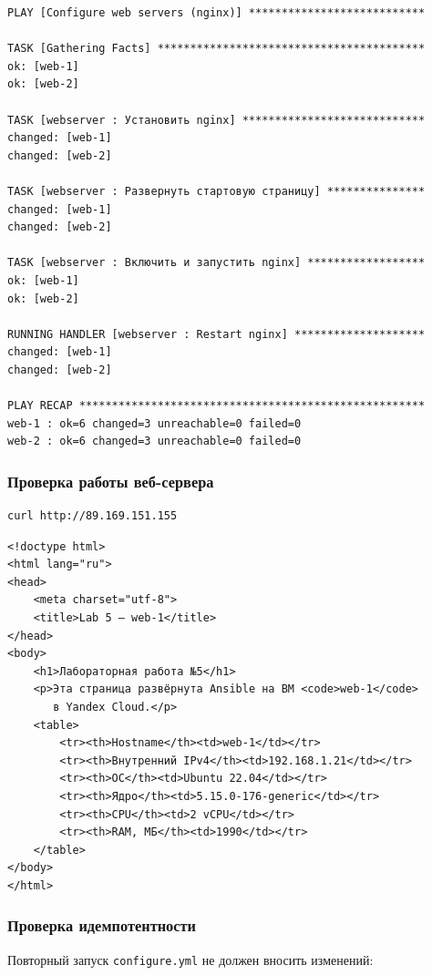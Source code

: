 \documentclass[12pt,a4paper]{article}
\begin{document}
\begin{lstlisting}
PLAY [Configure web servers (nginx)] ***************************

TASK [Gathering Facts] *****************************************
ok: [web-1]
ok: [web-2]

TASK [webserver : Установить nginx] ****************************
changed: [web-1]
changed: [web-2]

TASK [webserver : Развернуть стартовую страницу] ***************
changed: [web-1]
changed: [web-2]

TASK [webserver : Включить и запустить nginx] ******************
ok: [web-1]
ok: [web-2]

RUNNING HANDLER [webserver : Restart nginx] ********************
changed: [web-1]
changed: [web-2]

PLAY RECAP *****************************************************
web-1 : ok=6 changed=3 unreachable=0 failed=0
web-2 : ok=6 changed=3 unreachable=0 failed=0
\end{lstlisting}

\subsubsection{Проверка работы веб-сервера}

\begin{lstlisting}
curl http://89.169.151.155
\end{lstlisting}

\begin{lstlisting}
<!doctype html>
<html lang="ru">
<head>
    <meta charset="utf-8">
    <title>Lab 5 — web-1</title>
</head>
<body>
    <h1>Лабораторная работа №5</h1>
    <p>Эта страница развёрнута Ansible на ВМ <code>web-1</code>
       в Yandex Cloud.</p>
    <table>
        <tr><th>Hostname</th><td>web-1</td></tr>
        <tr><th>Внутренний IPv4</th><td>192.168.1.21</td></tr>
        <tr><th>ОС</th><td>Ubuntu 22.04</td></tr>
        <tr><th>Ядро</th><td>5.15.0-176-generic</td></tr>
        <tr><th>CPU</th><td>2 vCPU</td></tr>
        <tr><th>RAM, МБ</th><td>1990</td></tr>
    </table>
</body>
</html>
\end{lstlisting}

\subsubsection{Проверка идемпотентности}

Повторный запуск \texttt{configure.yml} не должен вносить изменений:
\end{document}
